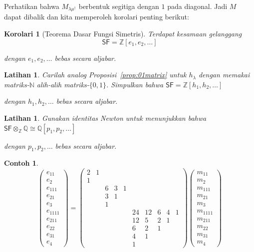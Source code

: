 \documentclass[12pt]{article}
\theoremstyle{plain}
\newtheorem{corollary}[theorem]{Korolari}
\newtheorem{exercise}[theorem]{Latihan}
\theoremstyle{definition}
\newtheorem{example}[theorem]{Contoh}
\theoremstyle{remark}
\numberwithin{equation}{section}
\begin{document}
Perhatikan bahwa $M_{\lambda\mu^\dag}$ berbentuk segitiga dengan $1$ pada diagonal.
Jadi $M$ dapat dibalik dan kita memperoleh korolari penting berikut:
\begin{corollary}[Teorema Dasar Fungsi Simetris]
Terdapat kesamaan gelanggang
\[\mathsf{SF} = \mathbb{Z}[e_1,e_2,\ldots] \]

dengan $e_1,e_2,\ldots$ bebas secara aljabar.
\end{corollary}
\begin{exercise}
Carilah analog Proposisi~\ref{prop:01matrix} untuk $h_\lambda$
dengan memakai matriks-$\mathbb{N}$ alih-alih matriks-$\{0,1\}$.
Simpulkan bahwa 
$\mathsf{SF} = \mathbb{Z}[h_1,h_2,\ldots]$

dengan $h_1,h_2,\ldots$ bebas secara aljabar.
\end{exercise}
\begin{exercise}
Gunakan identitas Newton untuk menunjukkan bahwa 
$\mathsf{SF} \otimes_{\mathbb{Z}} \mathbb{Q} \cong \mathbb{Q}[p_1,p_2,\ldots]$

dengan $p_1,p_2,\ldots$ bebas secara aljabar.
\end{exercise}
\begin{example}
\[
\begin{pmatrix} e_{11}\\ e_2\\ e_{111}\\ e_{21}\\ e_3\\
e_{1111}\\ e_{211} \\ e_{22}\\ e_{31}\\ e_4
\end{pmatrix}
=
\begin{pmatrix}
2 & 1 &
 & & &
& & & & \\
1 & &
 & & &
& & & & \\
 & &
6 & 3 & 1 &
& & & & \\
 & &
3 & 1 & &
& & & & \\
 & &
1 & & &
& & & & \\
 & &
 & & &
24 & 12 & 6 & 4 & 1 \\
 & &
 & & &
12 & 5 & 2 & 1 & \\
 & &
 & & &
6 & 2 & 1 & & \\
 & &
 & & &
4 & 1 & & & \\
 & &
 & & &
1 & & & &
\end{pmatrix} 
\begin{pmatrix} m_{11}\\ m_2\\ m_{111}\\ m_{21}\\ m_3\\
m_{1111}\\ m_{211} \\ m_{22}\\ m_{31}\\ m_4
\end{pmatrix}
\]

\end{example}
\end{document}
